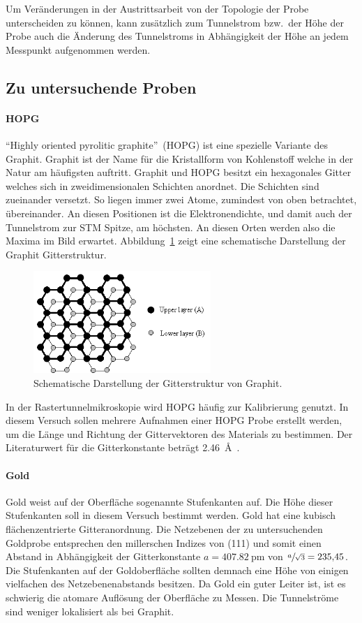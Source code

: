 Um Veränderungen in der Austrittsarbeit von der Topologie der Probe unterscheiden zu können,
kann zusätzlich zum Tunnelstrom bzw.\ der Höhe der Probe auch die Änderung des Tunnelstroms in Abhängigkeit der Höhe an jedem Messpunkt aufgenommen werden.

\subsection{Zu untersuchende Proben}

\paragraph{HOPG}
\enquote{Highly oriented pyrolitic graphite}~(HOPG) ist eine spezielle Variante des Graphit.
Graphit ist der Name für die Kristallform von Kohlenstoff welche in der Natur am häufigsten auftritt. Graphit und HOPG besitzt ein hexagonales Gitter  welches sich in zweidimensionalen
Schichten anordnet. Die Schichten sind zueinander versetzt. So liegen immer zwei Atome, zumindest von oben betrachtet,  übereinander. An diesen
Positionen ist die Elektronendichte, und damit auch der Tunnelstrom zur STM Spitze, am höchsten. An diesen Orten werden also die Maxima im Bild erwartet.
Abbildung~\ref{fig:hopg_structure} zeigt eine schematische Darstellung der Graphit Gitterstruktur.
\begin{figure}
  \centering
  \includegraphics[width=0.6\textwidth]{images/hopg_structure.png}
  \caption{Schematische Darstellung der Gitterstruktur von Graphit.\cite{hopg_structure}}
  \label{fig:hopg_structure}
\end{figure}
In der Rastertunnelmikroskopie wird HOPG häufig zur Kalibrierung genutzt.
In diesem Versuch sollen mehrere Aufnahmen einer HOPG Probe erstellt werden,
um die Länge und Richtung der Gittervektoren des Materials zu bestimmen.
Der Literaturwert für die Gitterkonstante beträgt \SI{2.46}{\angstrom}~\cite{stm1}.

\paragraph{Gold}
Gold weist auf der Oberfläche sogenannte Stufenkanten auf. Die Höhe dieser Stufenkanten soll in diesem Versuch bestimmt werden.
Gold hat eine kubisch flächenzentrierte Gitteranordnung. Die Netzebenen der zu untersuchenden Goldprobe entsprechen den millerschen Indizes von  (111)
und somit einen Abstand in Abhängigkeit der Gitterkonstante $a=\SI{407.82}{\pico\meter}$ von $\sfrac{a}{\sqrt{3}} = \num{235.45}$\cite{stm_gold}.
Die Stufenkanten auf der Goldoberfläche sollten demnach eine Höhe von einigen vielfachen des Netzebenenabstands besitzen.
Da Gold ein guter Leiter ist, ist es schwierig die atomare Auflösung der Oberfläche zu Messen. Die Tunnelströme sind weniger lokalisiert
als bei Graphit.
